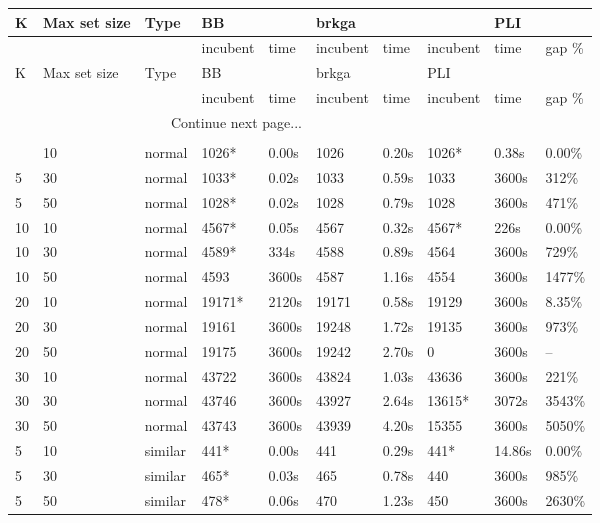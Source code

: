 \begin{scriptsize}
\setlength\LTleft{0pt}            %
\setlength\LTright{0pt}           %
\begin{longtable}{@{\extracolsep{\fill}}llllllllll@{}}
\label{table:tests}\\
\hline
K & Max set size & Type & BB & & brkga & & & PLI\\ 
\hline
& & & incubent & time & incubent & time & incubent & time & gap \%\\ 
\hline
\endfirsthead
\hline
K & Max set size & Type & BB & & brkga & & PLI\\ 
\hline
& & & incubent & time & incubent & time & incubent & time & gap \%\\ 
\hline
\endhead
\hline \multicolumn{5}{r}{{Continue next page...}} \\ 
\endfoot
\multicolumn{5}{r}{{}} \\ 
\endlastfoot
 5 & 10 & normal& 1026*& 0.00s& 1026& 0.20s & 1026*& 0.38s & 0.00\% \\
 5 & 30 & normal& 1033*& 0.02s& 1033& 0.59s & 1033& 3600s& 312\% \\
 5 & 50 & normal& 1028*& 0.02s& 1028& 0.79s & 1028& 3600s& 471\% \\
 10 & 10 & normal& 4567*& 0.05s& 4567& 0.32s & 4567*& 226s & 0.00\% \\
 10 & 30 & normal& 4589*& 334s & 4588& 0.89s & 4564& 3600s& 729\% \\
 10 & 50 & normal& 4593& 3600s& 4587& 1.16s & 4554& 3600s& 1477\% \\
 20 & 10 & normal& 19171*& 2120s & 19171& 0.58s & 19129& 3600s& 8.35\% \\
 20 & 30 & normal& 19161& 3600s& 19248& 1.72s & 19135& 3600s& 973\% \\
 20 & 50 & normal& 19175& 3600s& 19242& 2.70s & 0& 3600s& -- \\
 30 & 10 & normal& 43722& 3600s& 43824& 1.03s & 43636& 3600s& 221\% \\
 30 & 30 & normal& 43746& 3600s& 43927& 2.64s & 13615*& 3072s & 3543\% \\
 30 & 50 & normal& 43743& 3600s& 43939& 4.20s & 15355& 3600s& 5050\% \\
 5 & 10 & similar& 441*& 0.00s& 441& 0.29s & 441*& 14.86s & 0.00\% \\
 5 & 30 & similar& 465*& 0.03s& 465& 0.78s & 440& 3600s& 985\% \\
 5 & 50 & similar& 478*& 0.06s& 470& 1.23s & 450& 3600s& 2630\% \\

\end{longtable}
\end{scriptsize}
